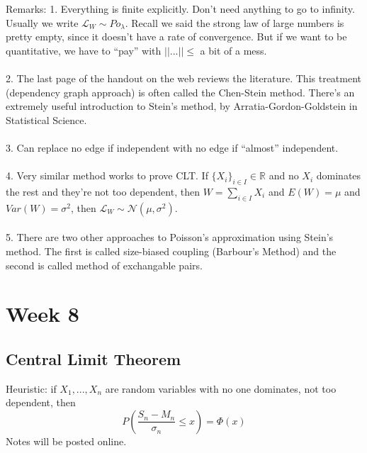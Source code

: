 \documentclass[12pt]{article}
\begin{document}
Remarks:  1.  Everything is finite explicitly.  Don't need anything to go to infinity.  Usually we write $ \mathcal{L}_W \sim Po_\lambda$.  Recall we said the strong law of large numbers is pretty empty, since it doesn't have a rate of convergence.  But if we want to be quantitative, we have to ``pay'' with $|| ... || \le $ a bit of a mess.
\\ \\
2.  The last page of the handout on the web reviews the literature.  This treatment (dependency graph approach) is often called the Chen-Stein method.  There's an extremely useful introduction to Stein's method, by Arratia-Gordon-Goldstein in Statistical Science.
\\ \\
3.  Can replace no edge if independent with no edge if ``almost'' independent.
\\ \\
4.  Very similar method works to prove CLT.  If $\{X_i\}_{i \in I} \in \mathbb{R}$ and no $X_i$ dominates the rest and they're not too dependent, then $W = \sum_{i \in I} X_i$ and $E(W) = \mu$ and $Var(W) = \sigma^2$, then $\mathcal{L}_W \sim \mathcal{N}(\mu, \sigma^2)$.
\\ \\
5.  There are two other approaches to Poisson's approximation using Stein's method.  The first is called size-biased coupling (Barbour's Method) and the second is called method of exchangable pairs.


\section{Week 8}
\subsection{Central Limit Theorem}
Heuristic: if $X_1, ..., X_n$ are random variables with no one dominates, not too dependent, then
$$P( \frac{S_n - M_n}{\sigma_n} \le x ) = \Phi(x) $$
Notes will be posted online.
\end{document}
